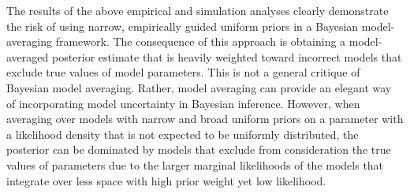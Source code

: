 The results of the above empirical and simulation analyses clearly demonstrate
the risk of using narrow, empirically guided uniform priors in a Bayesian
model-averaging framework.
The consequence of this approach is obtaining a model-averaged posterior
estimate that is heavily weighted toward incorrect models that exclude true
values of model parameters.
This is not a general critique of Bayesian model averaging.
Rather, model averaging can provide an elegant way of incorporating
model uncertainty in Bayesian inference.
However, when averaging over models with narrow and broad uniform priors on a
parameter with a likelihood density that is not expected to be uniformly
distributed, the posterior can be dominated by models that exclude from
consideration the true values of parameters due to the larger marginal
likelihoods of the models that integrate over less space with high prior
weight yet low likelihood.






